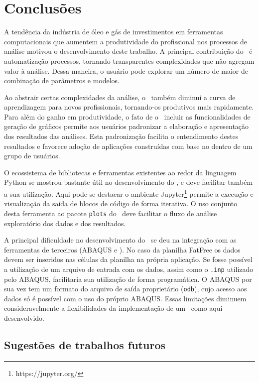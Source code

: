 \chapter{Conclusões}\label{chap:conclusao}


A tendência da indústria de óleo e gás de investimentos em ferramentas computacionais que aumentem a produtividade do profissional nos processos de análise motivou o desenvolvimento deste trabalho. A principal contribuição do \frame\ é automatização processos, tornando transparentes complexidades que não agregam valor à análise. Dessa maneira, o usuário pode explorar um número de maior de combinação de parâmetros e modelos.



Ao abstrair certas complexidades da análise, o \frame\ também diminui a curva de aprendizagem para novos profissionais, tornando-os produtivos mais rapidamente.
Para além do ganho em produtividade, o fato de o \frame\ incluir as funcionalidades de geração de gráficos permite aos usuários padronizar a elaboração e apresentação dos resultados das análises. Esta padronização facilita o entendimento destes resultados e favorece adoção de aplicações construídas com base no \frame dentro de um grupo de usuários.

O ecossistema de bibliotecas e ferramentas existentes ao redor da linguagem Python se mostrou bastante útil no desenvolvimento do \frame, e deve facilitar também a sua utilização. Aqui pode-se destacar o ambiente Jupyter\footnote{https://jupyter.org/} permite a execução e visualização da saída de blocos de código de forma iterativa. O uso conjunto desta ferramenta ao pacote \texttt{plots} do \frame\ deve facilitar o fluxo de análise exploratório dos dados e dos resultados.

A principal dificuldade no desenvolvimento do \frame\ se deu na integração com as ferramentas de terceiros (ABAQUS e \fatfree). No caso da planilha FatFree os dados devem ser inseridos nas células da planilha na própria aplicação. Se fosse possível a utilização de um arquivo de entrada com os dados, assim como o \texttt{.inp} utilizado pelo ABAQUS, facilitaria sua utilização de forma programática. O ABAQUS por sua vez tem um formato do arquivo de saída proprietário (\texttt{odb}), cujo acesso aos dados só é possível com o uso do próprio ABAQUS. Essas limitações diminuem consideravelmente a flexibilidades da implementação de um \frame\ como aqui desenvolvido.


\section{Sugestões de trabalhos futuros}



